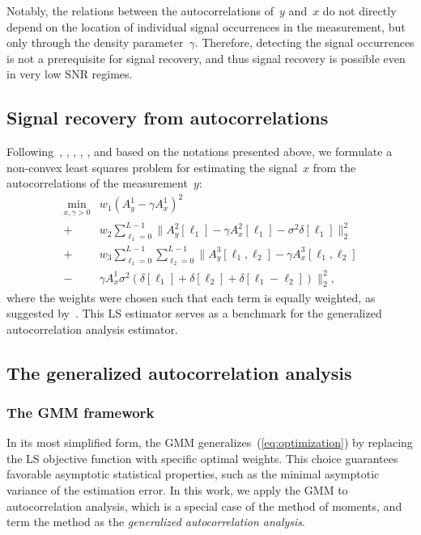 \documentclass{article}
\begin{document}
Notably, the relations between the autocorrelations of~$y$ and~$x$ do not directly depend on the location of individual signal occurrences in the measurement, but only through the density parameter~$\gamma$. Therefore, detecting the signal occurrences is not a prerequisite for signal recovery, and thus signal recovery is possible even in very low SNR regimes.

\subsection{Signal recovery from autocorrelations}
\label{subsec:sig_recovery}
Following~\cite{bendory2019multi}, \cite{lan2020multi}, \cite{marshall2020image}, \cite{bendory2021multi}, \cite{kreymer2021two}, and based on the notations presented above, we formulate a non-convex least squares problem for estimating the signal~$x$ from the autocorrelations of the measurement~$y$:
\begin{align}
\label{eq:optimization}
\min_{x, \gamma > 0} &w_1 (A_y^1 - \gamma A_x^1)^2 \nonumber\\ +& w_2 \sum_{\ell_1 = 0}^{L - 1} \|A_y^2[\ell_1] - \gamma A_x^2[\ell_1] - \sigma^2 \delta[\ell_1]\|_2^2\nonumber\\ +& w_3 \sum_{\ell_1 = 0}^{L - 1} \sum_{\ell_2 = 0}^{L - 1} \|A_y^3[\ell_1, \ell_2] - \gamma A_x^3[\ell_1, \ell_2] \nonumber\\ -& \gamma A_{x}^1 \sigma^2 (\delta[\ell_1] + \delta[\ell_2] + \delta[\ell_1 - \ell_2])\|_2^2,
\end{align}
where the weights were chosen such that each term is equally weighted, as suggested by~\cite{bendory2019multi}. This LS estimator serves as a benchmark for the generalized autocorrelation analysis estimator.

\subsection{The generalized autocorrelation analysis}
\label{subsec:generalized_ac}
\subsubsection{The GMM framework}
\label{gmm:framwork}
In its most simplified form, the GMM generalizes~(\ref{eq:optimization}) by replacing the LS objective function with specific optimal weights. This choice guarantees favorable asymptotic statistical properties, such as the minimal asymptotic variance of the estimation error. In this work, we apply the GMM to autocorrelation analysis, which is a special case of the method of moments, and term the method as the \textit{generalized autocorrelation analysis}.
\end{document}
